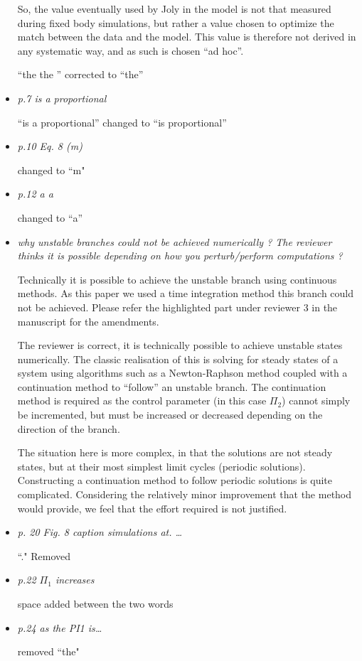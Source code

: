 \documentclass[]{article}
\begin{document}
\begin{itemize}
So, the value eventually used by Joly in the model is not that measured during fixed body simulations, but rather a value chosen to optimize the match between the data and the model. This value is therefore not derived in any systematic way, and as such is chosen “ad hoc”.

“the the ” corrected to “the”


\item \emph{p.7	is	a	proportional}

``is a proportional” changed to ``is proportional”

\item \emph{p.10	Eq.	8	(m)}

changed to ``m"

\item \emph{p.12 a a}

 changed to ``a”


\item \emph{why	unstable	branches	could	not	be	achieved	numerically	?	The	reviewer	thinks	
	it	is	possible	depending	on	how	you	perturb/perform	computations	?}

Technically it is possible to achieve the unstable branch using continuous methods. As this paper we used a time integration method this branch could not be achieved. Please refer the highlighted part under reviewer 3 in the manuscript for the amendments.

The reviewer is correct, it is technically possible to achieve unstable states numerically. The classic realisation of this is solving for steady states of a system using algorithms such as a Newton-Raphson method coupled with a continuation method to “follow” an unstable branch. The continuation method is required as the control parameter (in this case $\Pi_{2}$) cannot simply be incremented, but must be increased or decreased depending on the direction of the branch.

The situation here is more complex, in that the solutions are not steady states, but at their most simplest limit cycles (periodic solutions). Constructing a continuation method to follow periodic solutions is quite complicated. Considering the relatively minor improvement that the method would provide, we feel that the effort required is not justified.


\item \emph{p.	20 Fig.	8	caption	simulations	at.	…}

 ``." Removed 

\item \emph{p.22	$\Pi_{1}$ increases}

space added between the two words


\item \emph{p.24	as	the	PI1	is…}

removed ``the" 


\end{itemize}
\end{document}
